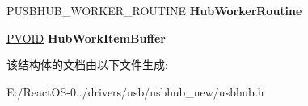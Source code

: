 \begin{DoxyCompactItemize}
\item 
\mbox{\label{struct___u_s_b_h_u_b___i_o___w_o_r_k___i_t_e_m_a4f3625af13e750daf7a731e2fe621890}} 
P\+U\+S\+B\+H\+U\+B\+\_\+\+W\+O\+R\+K\+E\+R\+\_\+\+R\+O\+U\+T\+I\+NE {\bfseries Hub\+Worker\+Routine}
\item 
\mbox{\label{struct___u_s_b_h_u_b___i_o___w_o_r_k___i_t_e_m_aa0f339bf9882baec37a90e76d2e15731}} 
\hyperlink{interfacevoid}{P\+V\+O\+ID} {\bfseries Hub\+Work\+Item\+Buffer}
\end{DoxyCompactItemize}


该结构体的文档由以下文件生成\+:\begin{DoxyCompactItemize}
\item 
E\+:/\+React\+O\+S-\/0../drivers/usb/usbhub\+\_\+new/usbhub.\+h\end{DoxyCompactItemize}
